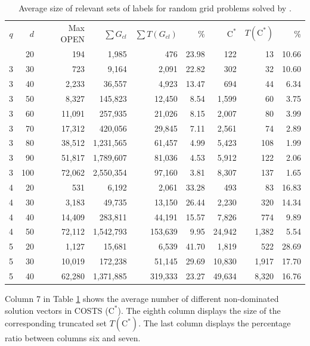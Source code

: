 \begin{table}
\caption{Average size of relevant sets of labels for random grid problems solved by \namoate.}
\begin{center}
\begin{tabular}{crrrrrrrr}
\hline \noalign{\smallskip}
$q$ & $d$ & Max OPEN & $\sum G_{cl}$ & $\sum T(G_{cl})$ & \% & $\text{C}^*$ & $T(\text{C}^*)$ & \%\\
\noalign{\smallskip} \hline 
3 & 20  & 194    & 1,985     & 476    & 23.98 & 122   & 13  & 10.66 \\
3 & 30  & 723    & 9,164     & 2,091  & 22.82 & 302   & 32  & 10.60 \\
3 & 40  & 2,233  & 36,557    & 4,923  & 13.47 & 694   & 44  &  6.34 \\
3 & 50  & 8,327  & 145,823   & 12,450 &  8.54 & 1,599 & 60  &  3.75 \\
3 & 60  & 11,091 & 257,935   & 21,026 &  8.15 & 2,007 & 80  &  3.99 \\
3 & 70  & 17,312 & 420,056   & 29,845 &  7.11 & 2,561 & 74  &  2.89 \\
3 & 80  & 38,512 & 1,231,565 & 61,457 &  4.99 & 5,423 & 108 &  1.99 \\
3 & 90  & 51,817 & 1,789,607 & 81,036 &  4.53 & 5,912 & 122 &  2.06 \\
3 & 100 & 72,062 & 2,550,354 & 97,160 &  3.81 & 8,307 & 137 &  1.65 \\
\noalign{\smallskip}
4 & 20  & 531     & 6,192     & 2,061   & 33.28 & 493    & 83    & 16.83 \\
4 & 30  & 3,183   & 49,735    & 13,150  & 26.44 & 2,230  & 320   & 14.34 \\
4 & 40  & 14,409  & 283,811   & 44,191  & 15.57 & 7,826  & 774   &  9.89 \\
4 & 50  & 72,112  & 1,542,793 & 153,639 & 9.95  & 24,942 & 1,382 &  5.54 \\
\noalign{\smallskip}
5 & 20  & 1,127   & 15,681     & 6,539    & 41.70 & 1,819   & 522   & 28.69 \\
5 & 30  & 10,019  & 172,238    & 51,145   & 29.69 & 10,830  & 1,917 & 17.70 \\
5 & 40  & 62,280  & 1,371,885  & 319,333  & 23.27 & 49,634  & 8,320 & 16.76 \\
\hline
\end{tabular} 
\end{center}
\label{tab:6-6}
\end{table}

Column 7 in Table \ref{tab:6-6} shows the average number of different non-dominated solution vectors in COSTS ($\text{C}^*$). The eighth column displays the size of the corresponding truncated set $T(\text{C}^*)$. The last column displays the percentage ratio between columns six and seven. 


